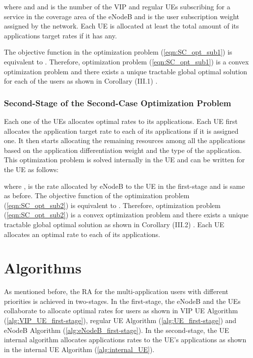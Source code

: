 \documentclass[journal]{IEEEtran} 				\IEEEoverridecommandlockouts 						\usepackage{amsmath,amssymb}
\begin{document}
where  and  and  is the number of the VIP and regular UEs subscribing for a service in the coverage area of the eNodeB and  is the  user subscription weight assigned by the network. Each UE is allocated at least the total amount of its applications target rates if it has any.

The objective function in the optimization problem (\ref{eqn:SC_opt_sub1}) is equivalent to .
Therefore, optimization problem (\ref{eqn:SC_opt_sub1}) is a convex optimization problem and there exists a unique tractable global optimal solution  for each of the  users as shown in Corollary (III.1) \cite{Ahmed_Utility3}.
\subsubsection{Second-Stage of the Second-Case Optimization Problem}\label{SC-SS-RA}
Each one of the  UEs allocates optimal rates  to its applications. Each UE first allocates the application target rate to each of its applications if it is assigned one. It then starts allocating the remaining resources among all the applications based on the application differentiation weight and the type of the application. This optimization problem is solved internally in the UE and can be written for the  UE as follows:

where ,  is the rate allocated by eNodeB to the  UE in the first-stage and  is same as before.
The objective function of the optimization problem (\ref{eqn:SC_opt_sub2}) is equivalent to . Therefore, optimization problem (\ref{eqn:SC_opt_sub2}) is a convex optimization problem and there exists a unique tractable global optimal solution as shown in Corollary (III.2) \cite{Ahmed_Utility3}. Each UE allocates an optimal rate  to each of its applications.
\section{Algorithms}\label{sec:two-stage-alg}
As mentioned before, the RA for the multi-application users with different priorities is achieved in two-stages. In the first-stage, the eNodeB and the UEs collaborate to allocate optimal rates  for users as shown in VIP UE Algorithm (\ref{alg:VIP_UE_first-stage}), regular UE Algorithm (\ref{alg:UE_first-stage}) and eNodeB Algorithm (\ref{alg:eNodeB_first-stage}). In the second-stage, the UE internal algorithm allocates applications rates  to the UE's applications as shown in the internal UE Algorithm (\ref{alg:internal_UE}).
\end{document}
